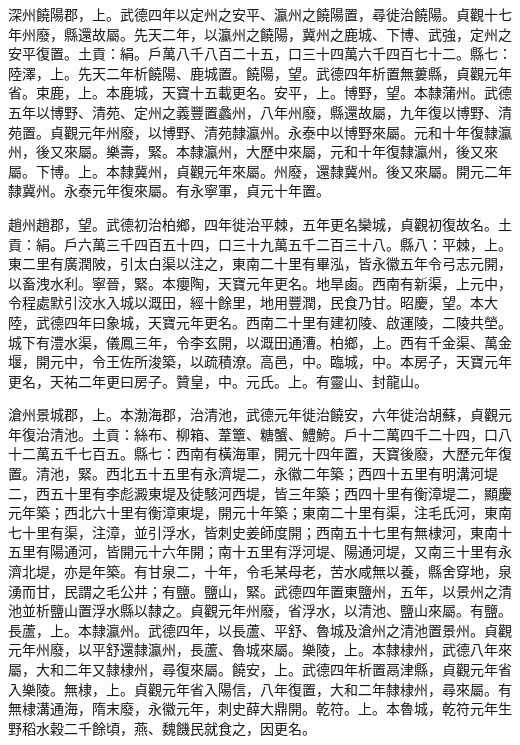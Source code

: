 \begin{pinyinscope}
 深州饒陽郡，上。武德四年以定州之安平、瀛州之饒陽置，尋徙治饒陽。貞觀十七年州廢，縣還故屬。先天二年，以瀛州之饒陽，冀州之鹿城、下博、武強，定州之安平復置。土貢：絹。戶萬八千八百二十五，口三十四萬六千四百七十二。縣七：陸澤，上。先天二年析饒陽、鹿城置。饒陽，望。武德四年析置無蔞縣，貞觀元年省。束鹿，上。本鹿城，天寶十五載更名。安平，上。博野，望。本隸蒲州。武德五年以博野、清苑、定州之義豐置蠡州，八年州廢，縣還故屬，九年復以博野、清苑置。貞觀元年州廢，以博野、清苑隸瀛州。永泰中以博野來屬。元和十年復隸瀛州，後又來屬。樂壽，緊。本隸瀛州，大歷中來屬，元和十年復隸瀛州，後又來屬。下博。上。本隸冀州，貞觀元年來屬。州廢，還隸冀州。後又來屬。開元二年隸冀州。永泰元年復來屬。有永寧軍，貞元十年置。



 趙州趙郡，望。武德初治柏鄉，四年徙治平棘，五年更名欒城，貞觀初復故名。土貢：絹。戶六萬三千四百五十四，口三十九萬五千二百三十八。縣八：平棘，上。東二里有廣潤陂，引太白渠以注之，東南二十里有畢泓，皆永徽五年令弓志元開，以畜洩水利。寧晉，緊。本癭陶，天寶元年更名。地旱鹵。西南有新渠，上元中，令程處默引洨水入城以溉田，經十餘里，地用豐潤，民食乃甘。昭慶，望。本大陸，武德四年曰象城，天寶元年更名。西南二十里有建初陵、啟運陵，二陵共塋。城下有澧水渠，儀鳳三年，令李玄開，以溉田通漕。柏鄉，上。西有千金渠、萬金堰，開元中，令王佐所浚築，以疏積潦。高邑，中。臨城，中。本房子，天寶元年更名，天祐二年更曰房子。贊皇，中。元氏。上。有靈山、封龍山。



 滄州景城郡，上。本渤海郡，治清池，武德元年徙治饒安，六年徙治胡蘇，貞觀元年復治清池。土貢：絲布、柳箱、葦簟、糖蟹、鱧鮬。戶十二萬四千二十四，口八十二萬五千七百五。縣七：西南有橫海軍，開元十四年置，天寶後廢，大歷元年復置。清池，緊。西北五十五里有永濟堤二，永徽二年築；西四十五里有明溝河堤二，西五十里有李彪澱東堤及徒駭河西堤，皆三年築；西四十里有衡漳堤二，顯慶元年築；西北六十里有衡漳東堤，開元十年築；東南二十里有渠，注毛氏河，東南七十里有渠，注漳，並引浮水，皆刺史姜師度開；西南五十七里有無棣河，東南十五里有陽通河，皆開元十六年開；南十五里有浮河堤、陽通河堤，又南三十里有永濟北堤，亦是年築。有甘泉二，十年，令毛某母老，苦水咸無以養，縣舍穿地，泉湧而甘，民謂之毛公井；有鹽。鹽山，緊。武德四年置東鹽州，五年，以景州之清池並析鹽山置浮水縣以隸之。貞觀元年州廢，省浮水，以清池、鹽山來屬。有鹽。長蘆，上。本隸瀛州。武德四年，以長蘆、平舒、魯城及滄州之清池置景州。貞觀元年州廢，以平舒還隸瀛州，長蘆、魯城來屬。樂陵，上。本隸棣州，武德八年來屬，大和二年又隸棣州，尋復來屬。饒安，上。武德四年析置鬲津縣，貞觀元年省入樂陵。無棣，上。貞觀元年省入陽信，八年復置，大和二年隸棣州，尋來屬。有無棣溝通海，隋末廢，永徽元年，刺史薛大鼎開。乾符。上。本魯城，乾符元年生野稻水穀二千餘頃，燕、魏饑民就食之，因更名。




\end{pinyinscope}
